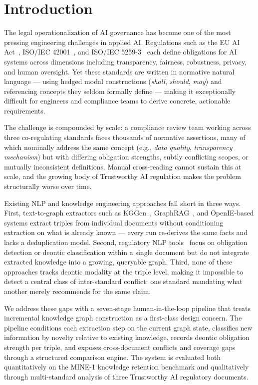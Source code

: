 \section{Introduction}

The legal operationalization of AI governance has become one of the most pressing engineering challenges in applied AI. Regulations such as the EU AI Act~\citep{euAIAct2024}, ISO/IEC 42001~\citep{iso42001}, and ISO/IEC 5259-3~\citep{iso52593} each define obligations for AI systems across dimensions including transparency, fairness, robustness, privacy, and human oversight. Yet these standards are written in normative natural language — using hedged modal constructions (\emph{shall}, \emph{should}, \emph{may}) and referencing concepts they seldom formally define — making it exceptionally difficult for engineers and compliance teams to derive concrete, actionable requirements.

The challenge is compounded by scale: a compliance review team working across three co-regulating standards faces thousands of normative assertions, many of which nominally address the same concept (e.g., \emph{data quality}, \emph{transparency mechanism}) but with differing obligation strengths, subtly conflicting scopes, or mutually inconsistent definitions. Manual cross-reading cannot sustain this at scale, and the growing body of Trustworthy AI regulation makes the problem structurally worse over time.

Existing NLP and knowledge engineering approaches fall short in three ways. First, text-to-graph extractors such as KGGen~\citep{mo2025kggen}, GraphRAG~\citep{edge2024graphrag}, and OpenIE-based systems extract triples from individual documents without conditioning extraction on what is already known — every run re-derives the same facts and lacks a deduplication model. Second, regulatory NLP tools~\citep{abualhaija2025llm,guliani2026jure} focus on obligation detection or deontic classification within a single document but do not integrate extracted knowledge into a growing, queryable graph. Third, none of these approaches tracks deontic modality at the triple level, making it impossible to detect a central class of inter-standard conflict: one standard mandating what another merely recommends for the same claim.

We address these gaps with a seven-stage human-in-the-loop pipeline that treats incremental knowledge graph construction as a first-class design concern. The pipeline conditions each extraction step on the current graph state, classifies new information by novelty relative to existing knowledge, records deontic obligation strength per triple, and exposes cross-document conflicts and coverage gaps through a structured comparison engine. The system is evaluated both quantitatively on the MINE-1 knowledge retention benchmark and qualitatively through multi-standard analysis of three Trustworthy AI regulatory documents.


